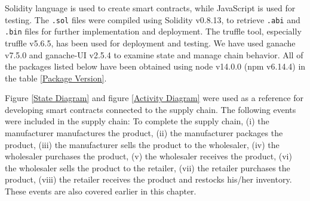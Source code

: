 \vspace{.5cm}

Solidity language is used to create smart contracts, while JavaScript is used for testing. The \texttt{.sol} files were compiled using Solidity v0.8.13, to retrieve \texttt{.abi} and \texttt{.bin} files for further implementation and deployment. The truffle tool, especially truffle v5.6.5, has been used for deployment and testing. We have used ganache v7.5.0 and ganache-UI v2.5.4 to examine state and manage chain behavior. All of the packages listed below have been obtained using node v14.0.0 (npm v6.14.4) in the table \ref{Package Version}.

\begin{table}[h]
\small
\centering
\caption{Package Version}
\label{Package Version}
\end{table}

\vspace{.5cm}

Figure \ref{State Diagram} and figure \ref{Activity Diagram} were used as a reference for developing smart contracts connected to the supply chain. The following events were included in the supply chain: To complete the supply chain, (i) the manufacturer manufactures the product, (ii) the manufacturer packages the product, (iii) the manufacturer sells the product to the wholesaler, (iv) the wholesaler purchases the product, (v) the wholesaler receives the product, (vi) the wholesaler sells the product to the retailer, (vii) the retailer purchases the product, (viii) the retailer receives the product and restocks his/her inventory. These events are also covered earlier in this chapter.

